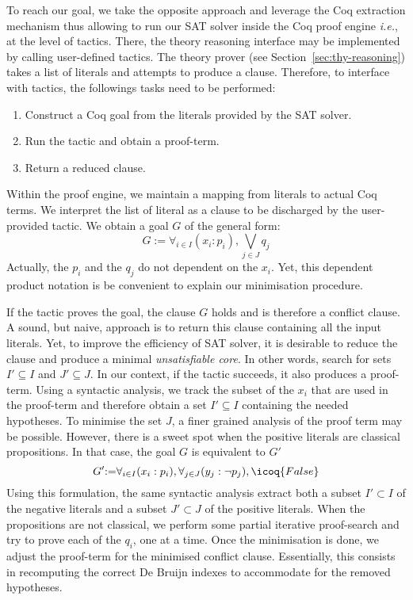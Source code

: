 \documentclass[utf8,a4paper,UKenglish,cleveref, autoref, thm-restate]{lipics-v2019}
\begin{document}
To reach our goal, we take the opposite approach and leverage the Coq
extraction mechanism thus allowing to run our SAT solver inside the
Coq proof engine \emph{i.e.}, at the level of tactics.
%
There, the theory reasoning interface may be implemented by calling
user-defined tactics.
%
The theory prover  (see Section~\ref{sec:thy-reasoning})
takes a list of literals and attempts to produce a clause.
Therefore, to interface with tactics, the followings tasks need to be performed:
\begin{enumerate}
\item Construct a Coq goal from the literals provided by the SAT solver.
\item Run the tactic and obtain a proof-term.
\item Return a reduced clause.
\end{enumerate}
Within the proof engine, we maintain a mapping from literals to actual
Coq terms. We interpret the list of literal as a clause to be
discharged by the user-provided tactic. We obtain a goal $G$ of the general form:
\[
  G {:=} \forall_{i\in I} (x_i:p_i), \bigvee_{j\in J} q_j
\]
Actually, the $p_i$ and the $q_j$ do not dependent on the
$x_i$. Yet, this dependent product notation is be convenient to
explain our minimisation procedure.

If the tactic proves the goal, the clause $G$ holds and is therefore a
conflict clause.  A sound, but naive, approach is to return this clause
containing all the input literals.
%
Yet, to improve the efficiency of SAT solver, it is desirable to
reduce the clause and produce a minimal \emph{unsatisfiable
  core}. In other words, search for sets $I' \subseteq I$ and $J' \subseteq J$.
%
In our context, if the tactic succeeds, it also produces a
proof-term.
%
Using a syntactic analysis, we track the subset of the $x_i$ that
are used in the proof-term and therefore obtain a set $I'\subseteq I$ containing the needed hypotheses.
%
To minimise the set $J$, a finer grained analysis of the proof term may be possible.
However, there is a sweet spot when the positive literals are classical propositions.
In that case, the goal $G$ is equivalent to $G'$
\[
  G' {:=} \forall_{i\in I} (x_i:p_i), \forall_{j\in J} (y_j:\neg p_j), \icoq{False}
\]
Using this formulation, the same syntactic analysis extract both a subset
$I' \subset I$ of the negative literals and a subset $J' \subset J$ of
the positive literals.  When the propositions are not classical, we
perform some partial iterative proof-search and try to prove each of
the $q_i$, one at a time.
%
Once the minimisation is done, we adjust the proof-term for the minimised
conflict clause. Essentially, this consists in recomputing the correct De Bruijn
indexes to accommodate for the removed hypotheses. 
\end{document}
